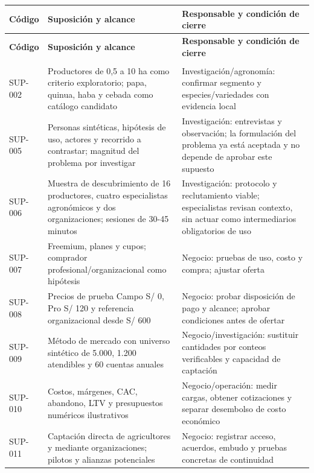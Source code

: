 \documentclass[10pt,a4paper]{article}
\begin{document}
\begingroup\small
\begin{longtable}{>{\raggedright\arraybackslash}p{2.061cm}>{\raggedright\arraybackslash}p{7.294cm}>{\raggedright\arraybackslash}p{6.501cm}}
\toprule
\textbf{Código} & \textbf{Suposición y alcance} & \textbf{Responsable y condición de cierre} \\
\midrule\endfirsthead
\toprule
\textbf{Código} & \textbf{Suposición y alcance} & \textbf{Responsable y condición de cierre} \\
\midrule\endhead
\midrule\multicolumn{3}{r}{\scriptsize Continúa en la página siguiente}\\\endfoot
\bottomrule\endlastfoot
SUP-002 & Productores de 0,5 a 10 ha como criterio exploratorio; papa, quinua, haba y cebada como catálogo candidato & Investigación/\allowbreak{}agronomía: confirmar segmento y especies/\allowbreak{}variedades con evidencia local \\[3pt]
SUP-005 & Personas sintéticas, hipótesis de uso, actores y recorrido a contrastar; magnitud del problema por investigar & Investigación: entrevistas y observación; la formulación del problema ya está aceptada y no depende de aprobar este supuesto \\[3pt]
SUP-006 & Muestra de descubrimiento de 16 productores, cuatro especialistas agronómicos y dos organizaciones; sesiones de 30-45 minutos & Investigación: protocolo y reclutamiento viable; especialistas revisan contexto, sin actuar como intermediarios obligatorios de uso \\[3pt]
SUP-007 & Freemium, planes y cupos; comprador profesional/\allowbreak{}organizacional como hipótesis & Negocio: pruebas de uso, costo y compra; ajustar oferta \\[3pt]
SUP-008 & Precios de prueba Campo S/\allowbreak{} 0, Pro S/\allowbreak{} 120 y referencia organizacional desde S/\allowbreak{} 600 & Negocio: probar disposición de pago y alcance; aprobar condiciones antes de ofertar \\[3pt]
SUP-009 & Método de mercado con universo sintético de 5.000, 1.200 atendibles y 60 cuentas anuales & Negocio/\allowbreak{}investigación: sustituir cantidades por conteos verificables y capacidad de captación \\[3pt]
SUP-010 & Costos, márgenes, CAC, abandono, LTV y presupuestos numéricos ilustrativos & Negocio/\allowbreak{}operación: medir cargas, obtener cotizaciones y separar desembolso de costo económico \\[3pt]
SUP-011 & Captación directa de agricultores y mediante organizaciones; pilotos y alianzas potenciales & Negocio: registrar acceso, acuerdos, embudo y pruebas concretas de continuidad \\[3pt]

\end{longtable}
\end{document}
